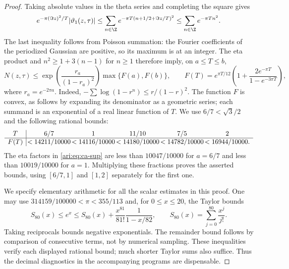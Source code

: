\begin{proof}
Taking absolute values in the theta series and completing the square
gives
\[
 e^{-\pi(\Im z)^2/T}|\vartheta_1(z,\tau)|
 \le\sum_{n\in\Z}
 e^{-\pi T(n+1/2+\Im z/T)^2}
 \le\sum_{n\in\Z}e^{-\pi Tn^2}.
\]
The last inequality follows from Poisson summation: the Fourier
coefficients of the periodized Gaussian are positive, so its maximum
is at an integer. The eta product and $n^2\ge1+3(n-1)$ for $n\ge1$
therefore imply, on $a\le T\le b$,
\begin{equation}\label{ari:eq:ca-sup}
 N(z,\tau)\le
 \exp\!\left(\frac{r_a}{(1-r_a)^2}\right)
 \max\{F(a),F(b)\},\qquad
 F(T)=e^{\pi T/12}
 \left(1+\frac{2e^{-\pi T}}{1-e^{-3\pi T}}\right),
\end{equation}
where $r_a=e^{-2\pi a}$. Indeed,
$-\sum\log(1-r^n)\le r/(1-r)^2$. The function $F$ is convex,
as follows by expanding its denominator as a geometric series;
each summand is an exponential of a real linear function of $T$.
We use $6/7<\sqrt3/2$ and the following rational bounds:
\[
\begin{array}{c|@{\,}c@{\,}c@{\,}c@{\,}c@{\,}c}
T&6/7&1&11/10&7/5&2\\ \hline
F(T)&<14211/10000&<14116/10000&<14180/10000&<14782/10000&<16944/10000.
\end{array}
\]
The eta factors in \eqref{ari:eq:ca-sup} are less than $10047/10000$
for $a=6/7$ and less than $10019/10000$ for $a=1$.
Multiplying these fractions proves the asserted bounds, using
$[6/7,1]$ and $[1,2]$ separately for the first one.

We specify elementary arithmetic for all the scalar estimates in
this proof. One may use $314159/100000<\pi<355/113$ and, for
$0\le x\le20$, the Taylor bounds
\begin{equation}\label{ari:eq:ca-exp}
 S_{80}(x)\le e^x\le
 S_{80}(x)+\frac{x^{81}}{81!}\frac1{1-x/82},
 \qquad S_{80}(x)=\sum_{j=0}^{80}\frac{x^j}{j!}.
\end{equation}
Taking reciprocals bounds negative exponentials. The remainder
bound follows by comparison of consecutive terms, not by numerical
sampling. These inequalities verify each displayed rational bound;
much shorter Taylor sums also suffice. Thus the decimal diagnostics
in the accompanying programs are dispensable.


\end{proof}
